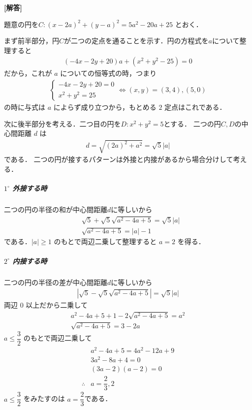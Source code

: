 \documentclass[../../main.tex]{subfiles}
\begin{document}
\begin{oframed}
  
\end{oframed}

{\bf [解答]}

題意の円を$C: (x - 2a)^2 + (y - a)^2 = 5a^2 - 20a + 25$ とおく．

まず前半部分，円$C$が二つの定点を通ることを示す．円の方程式を$a$について整理すると
\begin{align}
  (-4x - 2y + 20)a + (x^2 + y^2 - 25) = 0
\end{align}
だから，これが $a$ についての恒等式の時，つまり
\begin{align}
  \begin{cases}
    -4x - 2y + 20 = 0 \\
    x^2 + y^2 = 25
  \end{cases}
  \iff (x,y) = (3,4), (5,0)
\end{align}
の時に与式は $a$ によらず成り立つから，もとめる $2$ 定点はこれである．

次に後半部分を考える．二つ目の円を$D: x^2+y^2=5$とする．
二つの円$C, D$の中心間距離 $d$ は
\begin{align}
  d = \sqrt{(2a)^2 + a^2} = \sqrt{5}|a|
\end{align}
である．
二つの円が接するパターンは外接と内接があるから場合分けして考える．

\subparagraph{$1^\circ$ 外接する時}
二つの円の半径の和が中心間距離$d$に等しいから
\begin{align}
  & \sqrt{5} + \sqrt{5}\sqrt{a^2 - 4a + 5} = \sqrt{5}|a| \\
  & \sqrt{a^2 - 4a + 5} = |a| - 1
\end{align}
である．$|a| \ge 1$ のもとで両辺二乗して整理すると $a = 2$ を得る．

\subparagraph{$2^\circ$ 内接する時}
二つの円の半径の差が中心間距離$d$に等しいから
\begin{align}
  | \sqrt{5} - \sqrt{5}\sqrt{a^2 - 4a + 5} | = \sqrt{5}|a|
\end{align}
両辺 $0$ 以上だから二乗して
\begin{align}
  a^2 - 4a + 5 + 1 - 2\sqrt{a^2 - 4a + 5} = a^2 \\
  \sqrt{a^2 - 4a + 5} = 3 - 2a
\end{align}
$a \le \dfrac{3}{2}$ のもとで両辺二乗して
\begin{align}
  & a^2 - 4a + 5 = 4a^2 - 12a + 9 \\
  & 3a^2 - 8a + 4 = 0 \\
  & (3a - 2)(a - 2) = 0 \\
  \therefore
  & a = \dfrac{2}{3}, 2
\end{align}
$a \le \dfrac{3}{2}$ をみたすのは $a = \dfrac{2}{3}$である．
\casesend
\end{document}
